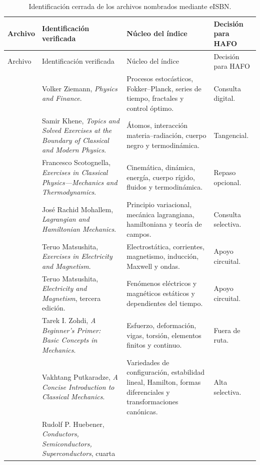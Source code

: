 \begin{longtable}{@{}L{3.10cm}L{4.35cm}L{4.35cm}L{2.70cm}@{}}
\caption{Identificación cerrada de los archivos nombrados mediante eISBN.}
\label{tab:drive-isbn-cerrado}\\
\toprule
Archivo & Identificación verificada & Núcleo del índice & Decisión para HAFO \\
\midrule
\endfirsthead
\toprule
Archivo & Identificación verificada & Núcleo del índice & Decisión para HAFO \\
\midrule
\endhead
{} &
Volker Ziemann, \emph{Physics and Finance}. &
Procesos estocásticos, Fokker--Planck, series de tiempo, fractales y control
óptimo. & Consulta digital. \\
 &
Samir Khene, \emph{Topics and Solved Exercises at the Boundary of Classical
and Modern Physics}. &
Átomos, interacción materia--radiación, cuerpo negro y termodinámica. &
Tangencial. \\
 &
Francesco Scotognella, \emph{Exercises in Classical Physics---Mechanics and
Thermodynamics}. &
Cinemática, dinámica, energía, cuerpo rígido, fluidos y termodinámica. &
Repaso opcional. \\
 &
José Rachid Mohallem, \emph{Lagrangian and Hamiltonian Mechanics}. &
Principio variacional, mecánica lagrangiana, hamiltoniana y teoría de campos. &
Consulta selectiva. \\
 &
Teruo Matsushita, \emph{Exercises in Electricity and Magnetism}. &
Electrostática, corrientes, magnetismo, inducción, Maxwell y ondas. &
Apoyo circuital. \\
 &
Teruo Matsushita, \emph{Electricity and Magnetism}, tercera edición. &
Fenómenos eléctricos y magnéticos estáticos y dependientes del tiempo. &
Apoyo circuital. \\
 &
Tarek I. Zohdi, \emph{A Beginner's Primer: Basic Concepts in Mechanics}. &
Esfuerzo, deformación, vigas, torsión, elementos finitos y continuo. &
Fuera de ruta. \\
 &
Vakhtang Putkaradze, \emph{A Concise Introduction to Classical Mechanics}. &
Variedades de configuración, estabilidad lineal, Hamilton, formas
diferenciales y transformaciones canónicas. & Alta selectiva. \\
 &
Rudolf P. Huebener, \emph{Conductors, Semiconductors, Superconductors}, cuarta

\end{longtable}
